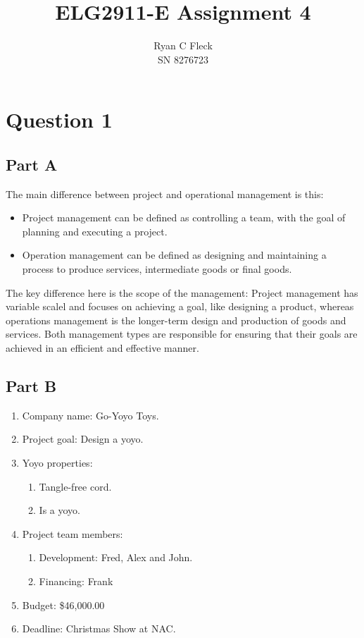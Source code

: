 \documentclass{article}
\begin{document}
\title{ELG2911-E Assignment 4}
\author{Ryan C Fleck \\ SN 8276723}

\maketitle

\section{Question 1}
\subsection{Part A}
The main difference between project and operational management is this:
\begin{itemize}
\item Project management can be defined as controlling a team, with the goal of planning and executing a project.
\item Operation management can be defined as designing and maintaining a process to produce services, intermediate goods or final goods.
\end{itemize}
The key difference here is the scope of the management: Project management has variable scalel and focuses on achieving a goal, like designing a product, whereas operations management is the longer-term design and production of goods and services. Both management types are responsible for ensuring that their goals are achieved in an efficient and effective manner. 
\subsection{Part B}
\begin{enumerate}
\item Company name: Go-Yoyo Toys.
\item Project goal: Design a yoyo.
\item Yoyo properties:
\begin{enumerate}
\item Tangle-free cord.
\item Is a yoyo.
\end{enumerate}
\item Project team members:
\begin{enumerate}
\item Development: Fred, Alex and John.
\item Financing: Frank
\end{enumerate}
\item Budget: \$46,000.00
\item Deadline: Christmas Show at NAC.
\end{enumerate}
\end{document}
